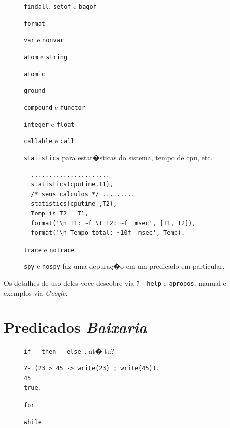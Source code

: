 \documentclass[final,a4paper]{article}
\begin{document}
\begin{description}

\item [] {\tt findall}, {\tt setof} e {\tt bagof}
\item [] {\tt format}
\item [] {\tt var} e {\tt nonvar}
\item [] {\tt atom} e {\tt string}
\item [] {\tt atomic} 
\item [] {\tt ground}
\item [] {\tt compound} e  {\tt functor}
\item [] {\tt integer} e {\tt float}
\item [] {\tt callable} e  {\tt call} 
\newpage

\item [] {\tt statistics} para estat�sticas
do sistema, tempo de cpu, etc.
{\small
\begin{verbatim}
  ......................
  statistics(cputime,T1),
  /* seus calculos */ .........
  statistics(cputime ,T2),
  Temp is T2 - T1, 
  format('\n T1: ~f \t T2: ~f  msec', [T1, T2]),
  format('\n Tempo total: ~10f  msec', Temp).
\end{verbatim}
}
\item [] {\tt trace} e {\tt notrace} 

\item [] {\tt spy} e {\tt nospy} faz uma depura\c{c}�o
em um predicado em particular.

\end{description}
Os detalhes de uso deles voce descobre via {\tt ?- help} e {\tt apropos}, manual  e exemplos
via {\em Google}.

\section{Predicados {\em Baixaria}}

\begin{description}

\item [] {\tt if -- then -- else }, at� tu?
{\small
\begin{verbatim}
?- (23 > 45 -> write(23) ; write(45)).
45
true.
\end{verbatim}
}
\item [] {\tt for}
\item [] {\tt while}

\end{description}
\end{document}
